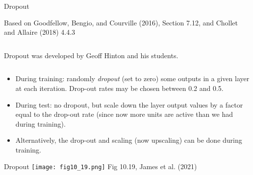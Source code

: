 \documentclass[
  10pt,
  ignorenonframetext,
]{beamer}
\begin{document}
\begin{frame}
\begin{block}{Dropout}
\protect\hypertarget{dropout}{}
\tiny

Based on Goodfellow, Bengio, and Courville (2016), Section 7.12, and
Chollet and Allaire (2018) 4.4.3

\normalsize

\(~\)

Dropout was developed by Geoff Hinton and his students.

\(~\)

\begin{itemize}
\item
  During training: randomly \emph{dropout} (set to zero) some outputs in
  a given layer at each iteration. Drop-out rates may be chosen between
  0.2 and 0.5. \vspace{1mm}
\item
  During test: no dropout, but scale down the layer output values by a
  factor equal to the drop-out rate (since now more units are active
  than we had during training). \vspace{1mm}
\item
  Alternatively, the drop-out and scaling (now upscaling) can be done
  during training. \vspace{1mm}
\end{itemize}
\end{block}
\end{frame}

\begin{frame}
\begin{block}{Dropout}
\protect\hypertarget{dropout-1}{}
\texttt{[image: fig10\_19.png]} \scriptsize Fig 10.19, James et al.
(2021)
\end{block}
\end{frame}
\end{document}
